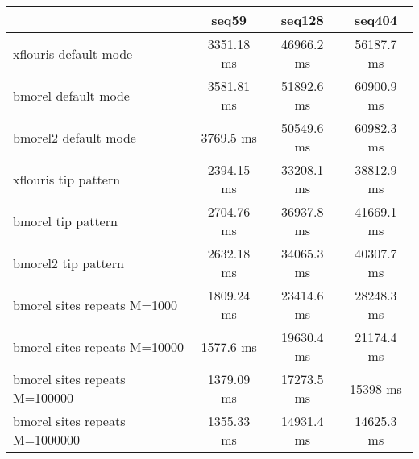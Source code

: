 \begin{tabular}{|l|c|c|c|}
\hline
 & seq59 & seq128 & seq404 \\
\hline
xflouris default mode & 3351.18 ms & 46966.2 ms & 56187.7 ms\\
\hline
bmorel default mode & 3581.81 ms & 51892.6 ms & 60900.9 ms\\
\hline
bmorel2 default mode & 3769.5 ms & 50549.6 ms & 60982.3 ms\\
\hline
xflouris tip pattern & 2394.15 ms & 33208.1 ms & 38812.9 ms\\
\hline
bmorel tip pattern & 2704.76 ms & 36937.8 ms & 41669.1 ms\\
\hline
bmorel2 tip pattern & 2632.18 ms & 34065.3 ms & 40307.7 ms\\
\hline
bmorel sites repeats M=1000 & 1809.24 ms & 23414.6 ms & 28248.3 ms\\
\hline
bmorel sites repeats M=10000 & 1577.6 ms & 19630.4 ms & 21174.4 ms\\
\hline
bmorel sites repeats M=100000 & 1379.09 ms & 17273.5 ms & 15398 ms\\
\hline
bmorel sites repeats M=1000000 & 1355.33 ms & 14931.4 ms & 14625.3 ms\\
\hline
\end{tabular}
